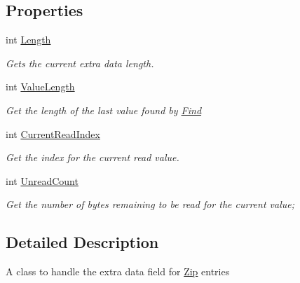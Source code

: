 \subsection*{Properties}
\begin{DoxyCompactItemize}
\item 
int \hyperlink{class_i_c_sharp_code_1_1_sharp_zip_lib_1_1_zip_1_1_zip_extra_data_a4e9d9554243ef4e4712b4eb7b0a10ba9}{Length}
\begin{DoxyCompactList}\small\item\em Gets the current extra data length. \end{DoxyCompactList}\item 
int \hyperlink{class_i_c_sharp_code_1_1_sharp_zip_lib_1_1_zip_1_1_zip_extra_data_a907c421a470d5c038fa18e696a84166c}{Value\+Length}
\begin{DoxyCompactList}\small\item\em Get the length of the last value found by \hyperlink{class_i_c_sharp_code_1_1_sharp_zip_lib_1_1_zip_1_1_zip_extra_data_a91e0c6c1d11967653256ccb161f9818c}{Find} \end{DoxyCompactList}\item 
int \hyperlink{class_i_c_sharp_code_1_1_sharp_zip_lib_1_1_zip_1_1_zip_extra_data_a7444c45305d5bc46bd2ca2cba71a9ea0}{Current\+Read\+Index}
\begin{DoxyCompactList}\small\item\em Get the index for the current read value. \end{DoxyCompactList}\item 
int \hyperlink{class_i_c_sharp_code_1_1_sharp_zip_lib_1_1_zip_1_1_zip_extra_data_a9d45dc3d898302d0fcff35e6960edccc}{Unread\+Count}
\begin{DoxyCompactList}\small\item\em Get the number of bytes remaining to be read for the current value; \end{DoxyCompactList}\end{DoxyCompactItemize}


\subsection{Detailed Description}
A class to handle the extra data field for \hyperlink{namespace_i_c_sharp_code_1_1_sharp_zip_lib_1_1_zip}{Zip} entries 


